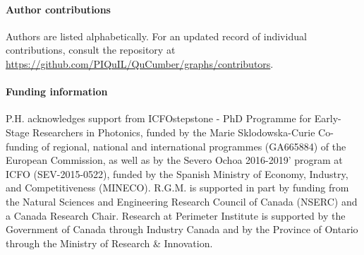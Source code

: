 \documentclass[submission, Phys]{SciPost}
\begin{document}
\paragraph{Author contributions}
Authors are listed alphabetically.  For an updated record of individual contributions, consult the repository at \url{https://github.com/PIQuIL/QuCumber/graphs/contributors}.

\paragraph{Funding information}
P.H. acknowledges support from ICFOstepstone - PhD Programme for Early-Stage Researchers in Photonics, funded by the Marie Sklodowska-Curie Co-funding of regional, national and international programmes (GA665884) of the European Commission, as well as by the Severo Ochoa 2016-2019' program at ICFO (SEV-2015-0522), funded by the Spanish Ministry of Economy, Industry, and Competitiveness (MINECO).
R.G.M. is supported in part by funding from the Natural Sciences and Engineering Research Council of Canada (NSERC) and a Canada Research Chair.
Research at Perimeter Institute is supported by the Government of Canada through Industry Canada and by the Province of Ontario through the Ministry of Research \& Innovation.
\end{document}
